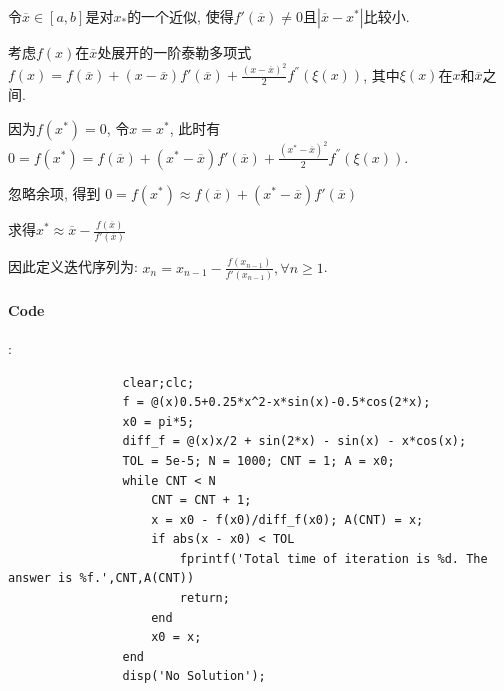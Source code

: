 \documentclass{article}
\begin{document}
\begin{CJK*}{UTF8}{song}
				令$\overline{x} \in \left[a,b\right]$是对$x_{*}$的一个近似, 使得$f'\left(\overline{x} \right) \neq 0$且$\left|\overline{x} - x^{*} \right|$比较小.
			
				考虑$f\left(x\right)$在$\overline{x}$处展开的一阶泰勒多项式$f\left(x\right) = f\left(\overline{x} \right) + \left(x - \overline{x}\right) f' \left(\overline{x} \right) + \frac{\left(x-\overline{x}\right)^2}{2}f^{''}\left(\xi \left(x\right) \right)$, 其中$\xi \left(x \right)$在$x$和$\overline{x}$之间.
			
				因为$f\left(x^{*}\right)=0$, 令$x=x^{*}$, 此时有
				$0 = f\left(x^{*}\right) = f\left(\overline{x} \right) + \left(x^{*} - \overline{x}\right) f' \left(\overline{x} \right) + \frac{\left(x^{*}-\overline{x}\right)^2}{2}f^{''}\left(\xi \left(x\right) \right)$.
			
				忽略余项, 得到
				$0 = f\left(x^{*}\right) \approx f\left(\overline{x} \right) + \left(x^{*} - \overline{x}\right) f' \left(\overline{x} \right)$
			
				求得$x^{*} \approx \overline{x} - \frac{f\left(\overline{x}\right)}{f'\left(\overline{x}\right)}$
			
				因此定义迭代序列为:
				$x_n = x_{n-1} - \frac{f\left(x_{n-1} \right)}{f'\left(x_{n-1} \right)},\forall n \geq 1$.
				
			\paragraph{Code}:\newline
				\begin{lstlisting}
				clear;clc;
				f = @(x)0.5+0.25*x^2-x*sin(x)-0.5*cos(2*x);
				x0 = pi*5;
				diff_f = @(x)x/2 + sin(2*x) - sin(x) - x*cos(x);              
				TOL = 5e-5; N = 1000; CNT = 1; A = x0;
				while CNT < N
					CNT = CNT + 1;
					x = x0 - f(x0)/diff_f(x0); A(CNT) = x;
					if abs(x - x0) < TOL
						fprintf('Total time of iteration is %d. The answer is %f.',CNT,A(CNT))
						return;
					end
					x0 = x;
				end
				disp('No Solution');
				\end{lstlisting}
			

\end{CJK*}
\end{document}

